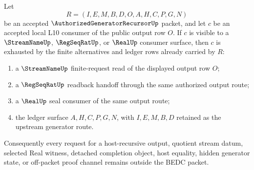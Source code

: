 \begin{lemma}
\label{lem:authorized-generator-recursor-l10-output-downstream-coverage}
Let
$$
R=(I,E,M,B,D,O,A,H,C,P,G,N)
$$
be an accepted $\AuthorizedGeneratorRecursorUp$ packet, and let $c$ be an accepted local L10 consumer of the public output row $O$. If $c$ is visible to a $\StreamNameUp$, $\RegSeqRatUp$, or $\RealUp$ consumer surface, then $c$ is exhausted by the finite alternatives and ledger rows already carried by $R$:
\begin{enumerate}
\item a $\StreamNameUp$ finite-request read of the displayed output row $O$;
\item a $\RegSeqRatUp$ readback handoff through the same authorized output route;
\item a $\RealUp$ seal consumer of the same output route;
\item the ledger surface $A,H,C,P,G,N$, with $I,E,M,B,D$ retained as the upstream generator route.
\end{enumerate}
Consequently every request for a host-recursive output, quotient stream datum, selected Real witness, detached completion object, host equality, hidden generator state, or off-packet proof channel remains outside the BEDC packet.
\end{lemma}
